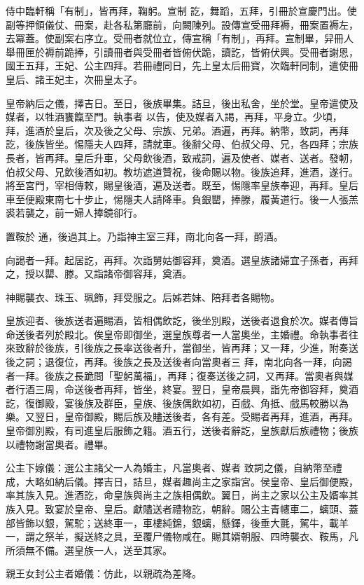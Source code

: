 \begin{pinyinscope}
 侍中臨軒稱「有制」，皆再拜，鞠躬。宣制
 訖，舞蹈，五拜，引冊於宣慶門出。使副等押領儀仗、冊案，赴各私第廳前，向闕陳列。設傳宣受冊拜褥，冊案置褥左，去冪蓋。使副案右序立。受冊者就位立，傳宣稱「有制」，再拜。宣制畢，舁冊人舉冊匣於褥前跪捧，引讀冊者與受冊者皆俯伏跪，讀訖，皆俯伏興。受冊者謝恩，國王五拜，王妃、公主四拜。若冊禮同日，先上皇太后冊寶，次臨軒同制，遣使冊皇后、諸王妃主，次冊皇太子。



 皇帝納后之儀，擇吉日。至日，後族畢集。詰旦，後出私舍，坐於堂。皇帝遣使及媒者，以牲酒饔餼至門。執事者
 以告，使及媒者入謁，再拜，平身立。少頃，拜，進酒於皇后，次及後之父母、宗族、兄弟。酒遍，再拜。納幣，致詞，再拜訖，後族皆坐。惕隱夫人四拜，請就車。後辭父母、伯叔父母、兄，各四拜；宗族長者，皆再拜。皇后升車，父母飲後酒，致戒詞，遍及使者、媒者、送者。發軔，伯叔父母、兄飲後酒如初。教坊遮道贊祝，後命賜以物。後族追拜，進酒，遂行。將至宮門，宰相傳敕，賜皇後酒，遍及送者。既至，惕隱率皇族奉迎，再拜。皇后車至便殿東南七十步止，惕隱夫人請降車。負銀罌，捧滕，履黃道行。後一人張羔裘若襲之，前一婦人捧鏡卻行。



 置鞍於
 通，後過其上。乃詣神主室三拜，南北向各一拜，酹酒。



 向謁者一拜。起居訖，再拜。次詣舅姑御容拜，奠酒。選皇族諸婦宜子孫者，再拜之，授以罌、滕。又詣諸帝御容拜，奠酒。



 神賜襲衣、珠玉、珮飾，拜受服之。后姊若妹、陪拜者各賜物。



 皇族迎者、後族送者遍賜酒，皆相偶飲訖，後坐別殿，送後者退食於次。媒者傳旨命送後者列於殿北。俟皇帝即御坐，選皇族尊者一人當奧坐，主婚禮。命執事者往來致辭於後族，引後族之長率送後者升，當御坐，皆再拜；又一拜，少進，附奏送後之詞；退復位，再拜。後族之長及送後者向當奧者三
 拜，南北向各一拜，向謁者一拜。後族之長跪問「聖躬萬福」，再拜；復奏送後之詞，又再拜。當奧者與媒者行酒三周，命送後者再拜，皆坐，終宴。翌日，皇帝晨興，詣先帝御容拜，奠酒訖，復御殿，宴後族及群臣，皇族、後族偶飲如初，百戲、角抵、戲馬較勝以為樂。又翌日，皇帝御殿，賜后族及贐送後者，各有差。受賜者再拜，進酒，再拜。皇帝御別殿，有司進皇后服飾之籍。酒五行，送後者辭訖，皇族獻后族禮物；後族以禮物謝當奧者。禮畢。



 公主下嫁儀：選公主諸父一人為婚主，凡當奧者、媒者
 致詞之儀，自納幣至禮成，大略如納后儀。擇吉日，詰旦，媒者趣尚主之家詣宮。侯皇帝、皇后御便殿，率其族入見。進酒訖，命皇族與尚主之族相偶飲。翼日，尚主之家以公主及婿率其族入見。致宴於皇帝、皇后。獻贐送者禮物訖，朝辭。賜公主青幰車二，螭頭、蓋部皆飾以銀，駕駝；送終車一，車樓純錦，銀螭，懸鐸，後垂大氈，駕牛，載羊一，謂之祭羊，擬送終之具，至覆尸儀物咸在。賜其婿朝服、四時襲衣、鞍馬，凡所須無不備。選皇族一人，送至其家。



 親王女封公主者婚儀：仿此，以親疏為差降。



\end{pinyinscope}
